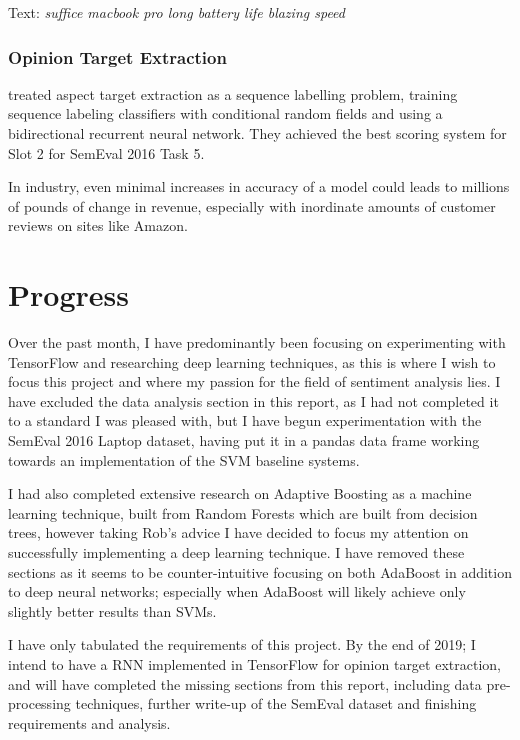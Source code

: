 \begin{center}
    Text: \textit{suffice macbook pro long battery life blazing speed}
\end{center}




\subsubsection{Opinion Target Extraction}
\textcolor{cite}{\citet{tohsu}} treated aspect target extraction as a sequence labelling problem, training sequence labeling classifiers with conditional random fields and using a bidirectional recurrent neural network. They achieved the best scoring system for Slot 2 for SemEval 2016 Task 5.  


In industry, even minimal increases in accuracy of a model could leads to millions of pounds of change in revenue, especially with inordinate amounts of customer reviews on sites like Amazon. 




\section{Progress}

Over the past month, I have predominantly been focusing on experimenting with TensorFlow and researching deep learning techniques, as this is where I wish to focus this project and where my passion for the field of sentiment analysis lies. 
I have excluded the data analysis section in this report, as I had not completed it to a standard I was pleased with, but I have begun experimentation with the SemEval 2016 Laptop dataset, having put it in a pandas data frame working towards an implementation of the SVM baseline systems. 

I had also completed extensive research on Adaptive Boosting as a machine learning technique, built from Random Forests which are built from decision trees, however taking Rob's advice I have decided to focus my attention on successfully implementing a deep learning technique. I have removed these sections as it seems to be counter-intuitive focusing on both AdaBoost in addition to deep neural networks; especially when AdaBoost will likely achieve only slightly better results than SVMs.

I have only tabulated the requirements of this project.
By the end of 2019; I intend to have a RNN implemented in TensorFlow for opinion target extraction, and will have completed the missing sections from this report, including data pre-processing techniques, further write-up of the SemEval dataset and finishing requirements and analysis.   

